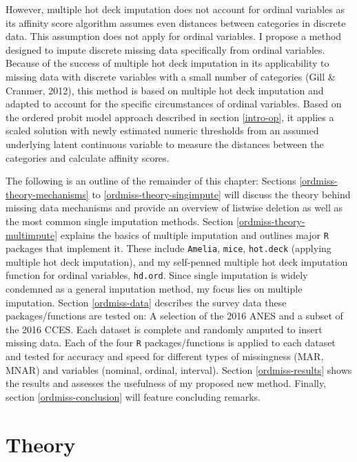 \documentclass[12pt,econ]{sources/authesis}
\begin{document}
However, multiple hot deck imputation does not account for ordinal variables as its affinity score algorithm assumes even distances between categories in discrete data. This assumption does not apply for ordinal variables. I propose a method designed to impute discrete missing data specifically from ordinal variables. Because of the success of multiple hot deck imputation in its applicability to missing data with discrete variables with a small number of categories (Gill \& Cranmer, 2012), this method is based on multiple hot deck imputation and adapted to account for the specific circumstances of ordinal variables. Based on the ordered probit model approach described in section \ref{intro-op}, it applies a scaled solution with newly estimated numeric thresholds from an assumed underlying latent continuous variable to measure the distances between the categories and calculate affinity scores.

The following is an outline of the remainder of this chapter: Sections \ref{ordmiss-theory-mechanisms} to \ref{ordmiss-theory-singimpute} will discuss the theory behind missing data mechanisms and provide an overview of listwise deletion as well as the most common single imputation methods. Section \ref{ordmiss-theory-multimpute} explains the basics of multiple imputation and outlines major \texttt{R} packages that implement it. These include \texttt{Amelia}, \texttt{mice}, \texttt{hot.deck} (applying multiple hot deck imputation), and my self-penned multiple hot deck imputation function for ordinal variables, \texttt{hd.ord}. Since single imputation is widely condemned as a general imputation method, my focus lies on multiple imputation. Section \ref{ordmiss-data} describes the survey data these packages/functions are tested on: A selection of the 2016 ANES and a subset of the 2016 CCES. Each dataset is complete and randomly amputed to insert missing data. Each of the four \texttt{R} packages/functions is applied to each dataset and tested for accuracy and speed for different types of missingness (MAR, MNAR) and variables (nominal, ordinal, interval). Section \ref{ordmiss-results} shows the results and assesses the usefulness of my proposed new method. Finally, section \ref{ordmiss-conclusion} will feature concluding remarks.

\hypertarget{ordmiss-theory}{%
\section{Theory}\label{ordmiss-theory}}
\end{document}
